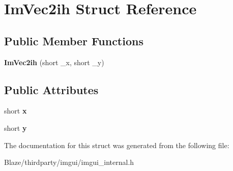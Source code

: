 \hypertarget{structImVec2ih}{}\section{Im\+Vec2ih Struct Reference}
\label{structImVec2ih}
\subsection*{Public Member Functions}
\begin{DoxyCompactItemize}
\item 
\mbox{\label{structImVec2ih_a6d35958bb7e1f00705f2817977acbe59}} 
{\bfseries Im\+Vec2ih} (short \+\_\+x, short \+\_\+y)
\end{DoxyCompactItemize}
\subsection*{Public Attributes}
\begin{DoxyCompactItemize}
\item 
\mbox{\label{structImVec2ih_a0963e82728b3ea68d882089e1f5e231b}} 
short {\bfseries x}
\item 
\mbox{\label{structImVec2ih_af8489174701c9070f3874cce8c1e514f}} 
short {\bfseries y}
\end{DoxyCompactItemize}


The documentation for this struct was generated from the following file\+:\begin{DoxyCompactItemize}
\item 
Blaze/thirdparty/imgui/imgui\+\_\+internal.\+h\end{DoxyCompactItemize}
